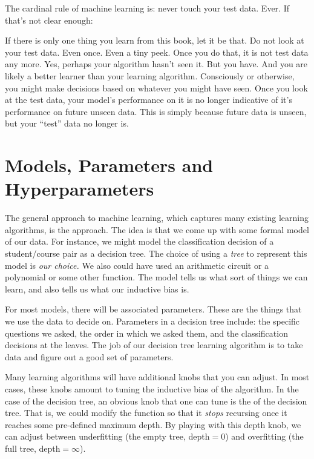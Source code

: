 The cardinal rule of machine learning is: never touch your test data.
Ever.  If that's not clear enough:

\noindent
{}

If there is only one thing you learn from this book, let it be that.
Do not look at your test data.  Even once.  Even a tiny peek.  Once
you do that, it is not test data any more.  Yes, perhaps your
algorithm hasn't seen it.  But you have.  And you are likely a better
learner than your learning algorithm.  Consciously or otherwise, you
might make decisions based on whatever you might have seen.  Once you
look at the test data, your model's performance on it is no longer
indicative of it's performance on future unseen data.  This is simply
because future data is unseen, but your ``test'' data no longer is.

\section{Models, Parameters and Hyperparameters}

The general approach to machine learning, which captures many existing
learning algorithms, is the  approach.  The idea is
that we come up with some formal model of our data.  For instance, we
might model the classification decision of a student/course pair as a
decision tree.  The choice of using a \emph{tree} to represent this
model is \emph{our choice.}  We also could have used an arithmetic
circuit or a polynomial or some other function.  The model tells us
what sort of things we can learn, and also tells us what our inductive
bias is.

For most models, there will be associated parameters.  These are the
things that we use the data to decide on.  Parameters in a decision
tree include: the specific questions we asked, the order in which we
asked them, and the classification decisions at the leaves.  The job
of our decision tree learning algorithm  is to take data
and figure out a good set of parameters.

Many learning algorithms will have additional knobs that you can
adjust.  In most cases, these knobs amount to tuning the inductive
bias of the algorithm.  In the case of the decision tree, an obvious
knob that one can tune is the  of the decision
tree.  That is, we could modify the  function so that it
\emph{stops} recursing once it reaches some pre-defined maximum depth.
By playing with this depth knob, we can adjust between underfitting
(the empty tree, depth$=0$) and overfitting (the full tree,
depth$=\infty$).

